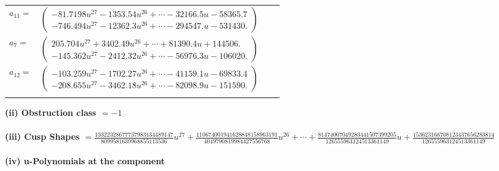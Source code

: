 \documentclass[1p]{elsarticle_modified}
\theoremstyle{definition}
\begin{document}
\begin{tabular}{m{7pt} m{180pt} m{7pt} m{180pt} }
\flushright $a_{11}=$&$\begin{pmatrix}-81.7198 u^{27}-1353.54 u^{26}+\cdots-32166.5 u-58365.7\\-746.494 u^{27}-12362.3 u^{26}+\cdots-294547. u-531430.\end{pmatrix}$ \\
\flushright $a_{7}=$&$\begin{pmatrix}205.704 u^{27}+3402.49 u^{26}+\cdots+81390.4 u+144506.\\-145.362 u^{27}-2412.32 u^{26}+\cdots-56976.3 u-106020.\end{pmatrix}$ \\
\flushright $a_{12}=$&$\begin{pmatrix}-103.259 u^{27}-1702.27 u^{26}+\cdots-41159.1 u-69833.4\\-208.655 u^{27}-3462.18 u^{26}+\cdots-82098.9 u-151590.\end{pmatrix}$\\&\end{tabular}
\flushleft \textbf{(ii) Obstruction class $= -1$}\\~\\
\flushleft \textbf{(iii) Cusp Shapes $= \frac{13322328677737983134489147}{8099581639968855113536} u^{27}+\frac{110674001941628848158963191}{4049790819984427556768} u^{26}+\cdots+\frac{81474007049283441507399205}{126555963124513361149} u+\frac{153623166708123437656283814}{126555963124513361149}$}\\~\\
\newpage\renewcommand{\arraystretch}{1}
\flushleft \textbf{(iv) u-Polynomials at the component}\newline \\
\end{document}
